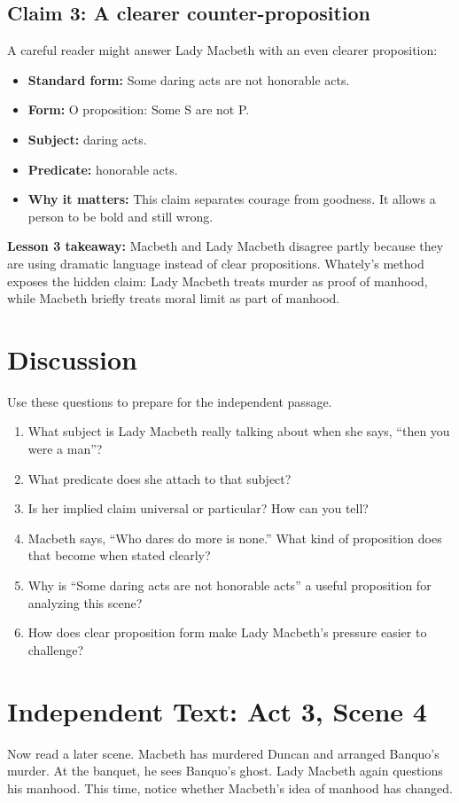 \documentclass[12pt]{article}
\newcommand{\focusbox}[1]{\par\vspace{0.35em}\noindent\begingroup\setlength{\fboxsep}{6pt}\colorbox{gray!12}{\begin{minipage}{\dimexpr\linewidth-2\fboxsep\relax}#1\end{minipage}}\endgroup\par\vspace{0.45em}}
\begin{document}
\subsection*{Claim 3: A clearer counter-proposition}
A careful reader might answer Lady Macbeth with an even clearer proposition:

\begin{itemize}[leftmargin=*]
\item \textbf{Standard form:} Some daring acts are not honorable acts.
\item \textbf{Form:} O proposition: Some S are not P.
\item \textbf{Subject:} daring acts.
\item \textbf{Predicate:} honorable acts.
\item \textbf{Why it matters:} This claim separates courage from goodness. It allows a person to be bold and still wrong.
\end{itemize}

\focusbox{\textbf{Lesson 3 takeaway:} Macbeth and Lady Macbeth disagree partly because they are using dramatic language instead of clear propositions. Whately's method exposes the hidden claim: Lady Macbeth treats murder as proof of manhood, while Macbeth briefly treats moral limit as part of manhood.}

\section*{Discussion}
Use these questions to prepare for the independent passage.

\begin{enumerate}[leftmargin=*]
\item What subject is Lady Macbeth really talking about when she says, ``then you were a man''?
\item What predicate does she attach to that subject?
\item Is her implied claim universal or particular? How can you tell?
\item Macbeth says, ``Who dares do more is none.'' What kind of proposition does that become when stated clearly?
\item Why is ``Some daring acts are not honorable acts'' a useful proposition for analyzing this scene?
\item How does clear proposition form make Lady Macbeth's pressure easier to challenge?
\end{enumerate}

\section*{Independent Text: Act 3, Scene 4}
Now read a later scene. Macbeth has murdered Duncan and arranged Banquo's murder. At the banquet, he sees Banquo's ghost. Lady Macbeth again questions his manhood. This time, notice whether Macbeth's idea of manhood has changed.
\end{document}
